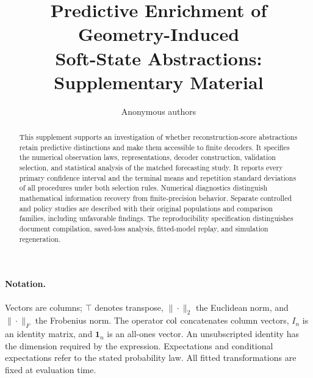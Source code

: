 \documentclass[10pt]{article}
\title{Predictive Enrichment of Geometry-Induced\\
Soft-State Abstractions:\\
Supplementary Material}
\author{Anonymous authors}
\begin{document}
\maketitle
\begin{abstract}
This supplement supports an investigation of whether reconstruction-score abstractions retain predictive distinctions and make them accessible to finite decoders. It specifies the numerical observation laws, representations, decoder construction, validation selection, and statistical analysis of the matched forecasting study. It reports every primary confidence interval and the terminal means and repetition standard deviations of all procedures under both selection rules. Numerical diagnostics distinguish mathematical information recovery from finite-precision behavior. Separate controlled and policy studies are described with their original populations and comparison families, including unfavorable findings. The reproducibility specification distinguishes document compilation, saved-loss analysis, fitted-model replay, and simulation regeneration.
\end{abstract}
\paragraph{Notation.} Vectors are columns; $\top$ denotes transpose, $\|\cdot\|_2$ the Euclidean norm, and $\|\cdot\|_F$ the Frobenius norm. The operator $\operatorname{col}$ concatenates column vectors, $I_n$ is an identity matrix, and $\mathbf1_n$ is an all-ones vector. An unsubscripted identity has the dimension required by the expression. Expectations and conditional expectations refer to the stated probability law. All fitted transformations are fixed at evaluation time.








\end{document}

